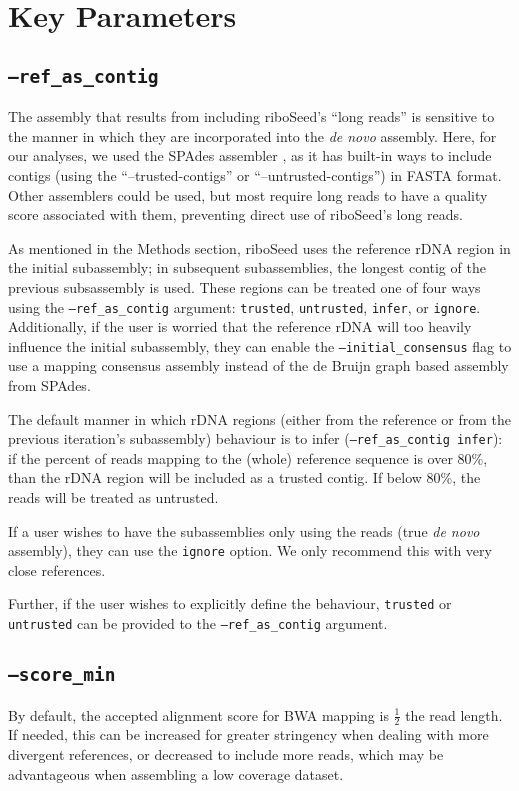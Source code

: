 \section*{Key Parameters}
\subsection*{\texttt{--ref\_as\_contig}}
The assembly that results from including riboSeed's ``long reads'' is sensitive to the manner in which they are incorporated into the \textit{de novo} assembly. Here, for our analyses, we used the SPAdes assembler \cite{Bankevich2012}, as it has built-in ways to include contigs (using the ``--trusted-contigs'' or ``--untrusted-contigs'') in FASTA format.  Other assemblers could be used, but most require long reads to have a quality score associated with them, preventing direct use of riboSeed's long reads.

As mentioned in the Methods section, riboSeed uses the reference rDNA region in the initial subassembly;  in subsequent subassemblies, the longest contig of the previous subsassembly is used.  These regions can be treated one of four ways using the \texttt{--ref\_as\_contig} argument: \texttt{trusted}, \texttt{untrusted}, \texttt{infer}, or \texttt{ignore}.  Additionally, if the user is worried that the reference rDNA will too heavily influence the initial subassembly, they can enable the \texttt{--initial\_consensus} flag to use a mapping consensus assembly instead of the de Bruijn graph based assembly from SPAdes.

The default manner in which rDNA regions (either from the reference or from the previous iteration's subassembly) behaviour is to infer (\texttt{--ref\_as\_contig infer}): if the percent of reads mapping to  the (whole) reference sequence  is over 80\%, than the rDNA region will be included as a trusted contig.  If below 80\%, the reads will be treated as untrusted.

If a user wishes to have the subassemblies only using the reads (true \textit{de novo} assembly), they can use the \texttt{ignore} option.  We only recommend this with very close references.

Further, if the user wishes to explicitly define the behaviour, \texttt{trusted} or \texttt{untrusted} can be provided to the \texttt{--ref\_as\_contig} argument.

\subsection*{\texttt{--score\_min}}
By default, the accepted alignment score for BWA mapping is $\frac{1}{2}$ the read length.  If needed, this can be increased for greater stringency when dealing with more divergent references, or decreased to include more reads, which may be advantageous when assembling a low coverage dataset.
